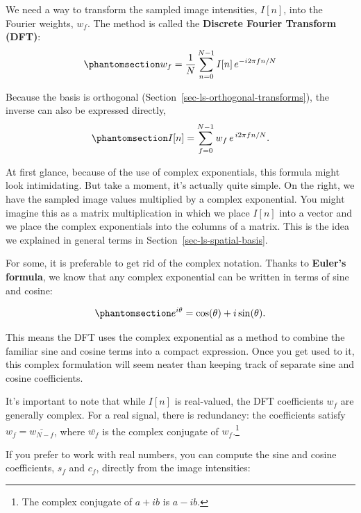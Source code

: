 \documentclass[
  letterpaper,
]{book}
\begin{document}
We need a way to transform the sampled image intensities, \(I[n]\), into
the Fourier weights, \(w_f\). The method is called the \textbf{Discrete
Fourier Transform (DFT)}:
\begin{equation}\phantomsection\label{eq-discrete-fourier-transform}{
w_f = \frac{1}{N} \sum_{n=0}^{N-1} I[n] \, e^{-i 2 \pi f n / N}
}\end{equation}

Because the basis is orthogonal
(Section~\ref{sec-ls-orthogonal-transforms}), the inverse can also be
expressed directly,
\begin{equation}\phantomsection\label{eq-inverse-dft}{
I[n] = \sum_{f=0}^{N-1} w_f \, e^{\,i 2 \pi f n / N}.
}\end{equation}

At first glance, because of the use of complex exponentials, this
formula might look intimidating. But take a moment, it's actually quite
simple. On the right, we have the sampled image values multiplied by a
complex exponential. You might imagine this as a matrix multiplication
in which we place \(I[n]\) into a vector and we place the complex
exponentials into the columns of a matrix. This is the idea we explained
in general terms in Section~\ref{sec-ls-spatial-basis}.

For some, it is preferable to get rid of the complex notation. Thanks to
\textbf{Euler's formula}, we know that any complex exponential can be
written in terms of sine and cosine:

\begin{equation}\phantomsection\label{eq-Eulers-formula}{
e^{i\theta} = \cos(\theta) + i\sin(\theta).
}\end{equation}

This means the DFT uses the complex exponential as a method to combine
the familiar sine and cosine terms into a compact expression. Once you
get used to it, this complex formulation will seem neater than keeping
track of separate sine and cosine coefficients.

It's important to note that while \(I[n]\) is real-valued, the DFT
coefficients \(w_f\) are generally complex. For a real signal, there is
redundancy: the coefficients satisfy \(w_{f} = \overline{w_{N-f}}\),
where \(\overline{w_f}\) is the complex conjugate of \(w_f\).\footnote{The
  complex conjugate of \(a + i b\) is \(a - i b\).}

If you prefer to work with real numbers, you can compute the sine and
cosine coefficients, \(s_f\) and \(c_f\), directly from the image
intensities:
\end{document}
